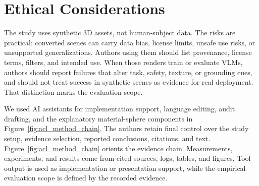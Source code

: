 \section*{Ethical Considerations}

\begingroup
{}
\sloppy

The study uses synthetic 3D assets, not human-subject data. The risks are
practical: converted scenes can carry data bias, license limits, unsafe use
risks, or unsupported generalizations. Authors using them should list provenance, license
terms, filters, and intended use. When
those renders train or evaluate VLMs, authors should report failures that alter
task, safety, texture, or grounding cues, and should not treat success in
synthetic scenes as evidence for real deployment. That distinction marks the
evaluation scope.

We used AI assistants for implementation support, language editing, audit
drafting, and the explanatory material-sphere components in
Figure~\ref{fig:acl_method_chain}. The authors retain final
control over the study setup, evidence selection, reported conclusions, citations, and text.
Figure~\ref{fig:acl_method_chain} orients the evidence chain. Measurements,
experiments, and results come from cited sources, logs, tables, and figures.
Tool output is used as implementation or presentation support, while the
empirical evaluation scope is defined by the recorded evidence.

\par
\endgroup
